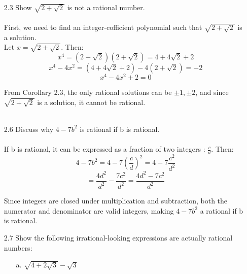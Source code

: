 
\usepackage{amsmath, dsfont}

\oddsidemargin 0in
\evensidemargin 0in
\textwidth 6.5in
\topmargin -0.5in
\textheight 9.0in
\newcommand{\norm}[1]{\left\lVert #1 \right\rVert}
\newcommand{\abs}[1]{\left\vert #1 \right\vert}
\newcommand{\?}{\stackrel{?}{=}}



\pagestyle{myheadings}

\begin{itemize}
  \item[2.3]
    Show $\sqrt{2 + \sqrt{2}}$ is not a rational number.\\\\

    First, we need to find an integer-cofficient polynomial such that $\sqrt{2 + \sqrt{2}}$ is a solution.\\
    Let $x = \sqrt{2 + \sqrt{2}}$. Then:
    $$x^4 = (2 + \sqrt{2})(2 + \sqrt{2}) = 4 + 4\sqrt{2} + 2$$
    $$x^4 - 4x^2 = (4 + 4\sqrt{2} + 2) - 4(2 + \sqrt{2}) = -2$$
    $$x^4 - 4x^2 + 2 = 0$$

    From Corollary 2.3, the only rational solutions can be $\pm 1, \pm 2$, and since  $\sqrt{2 + \sqrt{2}}$ is a solution, it cannot be rational.\\\\

  \item[2.6]
    Discuss why $4 - 7b^2$ is rational if b is rational.\\\\

    If b is rational, it can be expressed as a fraction of two integers : $\frac{c}{d}$. Then:
     $$4-7b^2 = 4 - 7(\frac{c}{d})^2 = 4 - 7\frac{c^2}{d^2}$$
     $$= \frac{4d^2}{d^2} - \frac{7c^2}{d^2} = \frac{4d^2 - 7c^2}{d^2}$$

     Since integers are closed under multiplication and subtraction, both the numerator and denominator are valid integers, making $4 - 7b^2$ a rational if b is rational.\\

  \item[2.7]
    Show the following irrational-looking expressions are actually rational numbers:
    \begin{itemize}
      \item [a.]
        $\sqrt{4 + 2\sqrt{3}} - \sqrt{3}$\\\\


\end{itemize}
\end{itemize}
